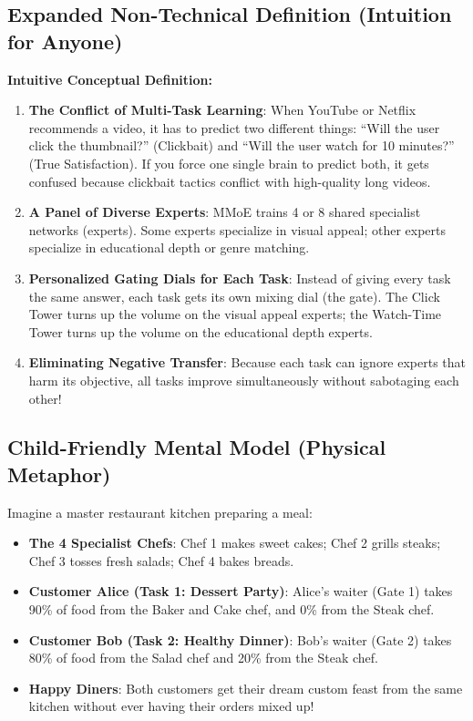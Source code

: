 \documentclass[11pt,a4paper]{article}
\theoremstyle{definition}
\begin{document}
\subsection{Expanded Non-Technical Definition (Intuition for Anyone)}
\textbf{Intuitive Conceptual Definition:}
\begin{enumerate}
    \item \textbf{The Conflict of Multi-Task Learning}: When YouTube or Netflix recommends a video, it has to predict two different things: ``Will the user click the thumbnail?'' (Clickbait) and ``Will the user watch for 10 minutes?'' (True Satisfaction). If you force one single brain to predict both, it gets confused because clickbait tactics conflict with high-quality long videos.
    \item \textbf{A Panel of Diverse Experts}: MMoE trains 4 or 8 shared specialist networks (experts). Some experts specialize in visual appeal; other experts specialize in educational depth or genre matching.
    \item \textbf{Personalized Gating Dials for Each Task}: Instead of giving every task the same answer, each task gets its own mixing dial (the gate). The Click Tower turns up the volume on the visual appeal experts; the Watch-Time Tower turns up the volume on the educational depth experts.
    \item \textbf{Eliminating Negative Transfer}: Because each task can ignore experts that harm its objective, all tasks improve simultaneously without sabotaging each other!
\end{enumerate}

\subsection{Child-Friendly Mental Model (Physical Metaphor)}
Imagine a master restaurant kitchen preparing a meal:
\begin{itemize}
    \item \textbf{The 4 Specialist Chefs}: Chef 1 makes sweet cakes; Chef 2 grills steaks; Chef 3 tosses fresh salads; Chef 4 bakes breads.
    \item \textbf{Customer Alice (Task 1: Dessert Party)}: Alice's waiter (Gate 1) takes 90\% of food from the Baker and Cake chef, and 0\% from the Steak chef.
    \item \textbf{Customer Bob (Task 2: Healthy Dinner)}: Bob's waiter (Gate 2) takes 80\% of food from the Salad chef and 20\% from the Steak chef.
    \item \textbf{Happy Diners}: Both customers get their dream custom feast from the same kitchen without ever having their orders mixed up!
\end{itemize}
\end{document}
